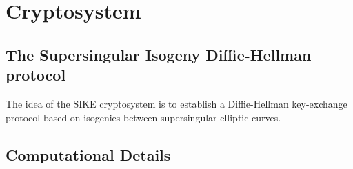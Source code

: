 \section{Cryptosystem}
\subsection{The Supersingular Isogeny Diffie-Hellman protocol}

The idea of the SIKE cryptosystem is to establish a Diffie-Hellman key-exchange protocol based on isogenies between supersingular elliptic curves. 

\subsection{Computational Details}